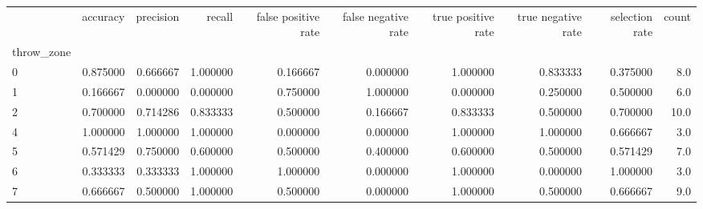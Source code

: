 \begin{tabular}{lrrrrrrrrr}
\toprule
{} &  accuracy &  precision &    recall &  false positive rate &  false negative rate &  true positive rate &  true negative rate &  selection rate &  count \\
throw\_zone &           &            &           &                      &                      &                     &                     &                 &        \\
\midrule
0          &  0.875000 &   0.666667 &  1.000000 &             0.166667 &             0.000000 &            1.000000 &            0.833333 &        0.375000 &    8.0 \\
1          &  0.166667 &   0.000000 &  0.000000 &             0.750000 &             1.000000 &            0.000000 &            0.250000 &        0.500000 &    6.0 \\
2          &  0.700000 &   0.714286 &  0.833333 &             0.500000 &             0.166667 &            0.833333 &            0.500000 &        0.700000 &   10.0 \\
4          &  1.000000 &   1.000000 &  1.000000 &             0.000000 &             0.000000 &            1.000000 &            1.000000 &        0.666667 &    3.0 \\
5          &  0.571429 &   0.750000 &  0.600000 &             0.500000 &             0.400000 &            0.600000 &            0.500000 &        0.571429 &    7.0 \\
6          &  0.333333 &   0.333333 &  1.000000 &             1.000000 &             0.000000 &            1.000000 &            0.000000 &        1.000000 &    3.0 \\
7          &  0.666667 &   0.500000 &  1.000000 &             0.500000 &             0.000000 &            1.000000 &            0.500000 &        0.666667 &    9.0 \\
\bottomrule
\end{tabular}
